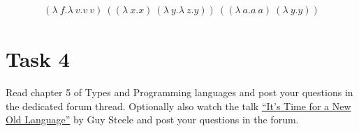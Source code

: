 \begin{align*}
    (\lambda\ f.\lambda\ v.v\ v)\ ((\lambda\ x.x)\ (\lambda\ y.\lambda\ z.y))\ ((\lambda\ a.a\ a)\ (\lambda\ y.y))
\end{align*}
%

\section*{Task 4}
Read chapter 5 of Types and Programming languages and post your questions in the dedicated forum thread.
Optionally also watch the talk \href{https://www.youtube.com/watch?v=dCuZkaaou0Q}{``It's Time for a New Old Language''} by Guy Steele and post your questions in the forum.

